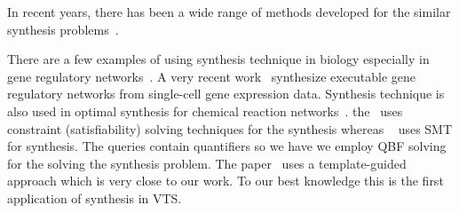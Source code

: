 In recent years, there has been a wide range of methods
developed for the similar synthesis problems~\cite{sktech,ceSynth,exampleSynth}.

There are a few examples of using synthesis technique in biology especially in gene regulatory networks~\cite{shavit2016automated, fisher2015synthesising}. A very recent work~\cite{fisher2015synthesising} synthesize executable gene regulatory networks from single-cell gene expression data. 
Synthesis technique is also used in optimal synthesis for chemical reaction networks~\cite{cardelli2017syntax}. the~\cite{fisher2015synthesising} uses constraint (satisfiability) solving techniques for the synthesis whereas ~\cite{shavit2016automated} uses SMT for synthesis. The queries contain quantifiers so we have we employ QBF solving for the solving the synthesis problem. The paper~\cite{cardelli2017syntax} uses a template-guided approach which is very close to our work. To our best knowledge this is the first application of synthesis in VTS.
